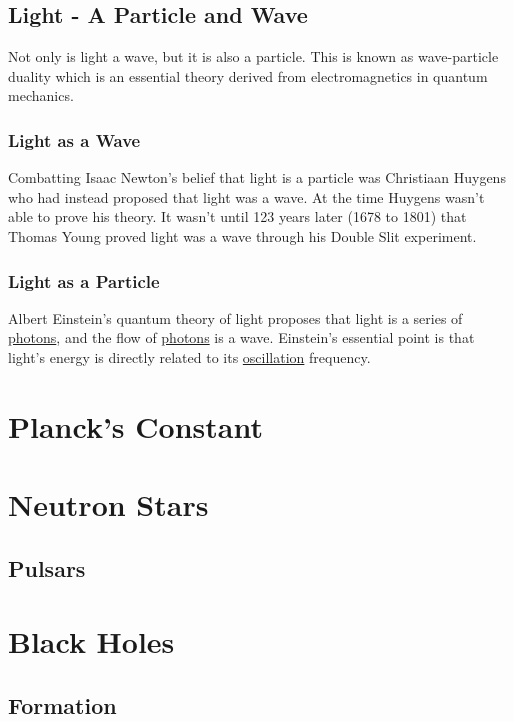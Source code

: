 \documentclass{article}
\begin{document}
\subsection{Light - A Particle and Wave}
Not only is light a wave, but it is also a particle. This is known as wave-particle duality which is an essential theory derived from electromagnetics in quantum mechanics.

\subsubsection{Light as a Wave}
Combatting Isaac Newton's belief that light is a particle was Christiaan Huygens who had instead proposed that light was a wave. At the time Huygens wasn't able to prove his theory. It wasn't until 123 years later (1678 to 1801) that Thomas Young proved light was a wave through his Double Slit experiment.

\subsubsection{Light as a Particle}
Albert Einstein's quantum theory of light proposes that light is a series of \hyperref[sec:photons]{photons}, and the flow of \hyperref[sec:photons]{photons} is a wave. Einstein's essential point is that light's energy is directly related to its \hyperref[sec:oscillation]{oscillation} frequency.



\section{Planck's Constant}




\section{Neutron Stars}

\subsection{Pulsars}




\section{Black Holes}
\subsection{Formation}
\end{document}

